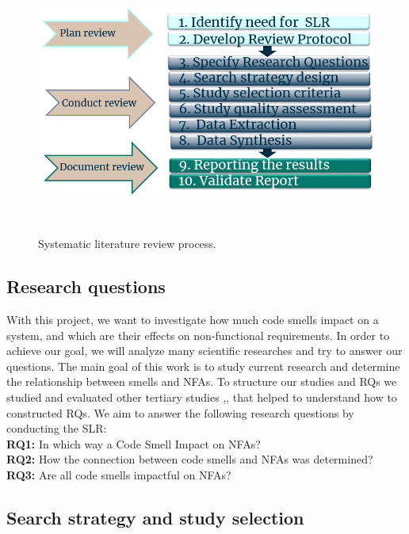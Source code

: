 \documentclass{sigchi}
\begin{document}
\begin{figure}[h]
\centering
  \includegraphics[width=1\columnwidth]{Figures/1}
  \caption{Systematic literature review process.}~\label{fig:figure1}
\end{figure}

\subsection{Research questions}
With this project, we want to investigate how much code smells impact on a system, and which are their effects on non-functional requirements. In order to achieve our goal, we will analyze many scientific researches and try to answer our questions. The main goal of this work is to study current research and determine the relationship between smells and NFAs. To structure our studies and RQs we studied and evaluated other tertiary studies \cite{Imtiaz},\cite{Khan}, that helped to understand how to constructed RQs. 
We aim to answer the following research questions by conducting the SLR: \\
\textbf{RQ1:} In which way a Code Smell Impact on NFAs? \\
\textbf{RQ2:} How the connection between code smells and NFAs was determined? \\
\textbf{RQ3:} Are all code smells impactful on NFAs? 

\subsection{Search strategy and study selection}
\end{document}
